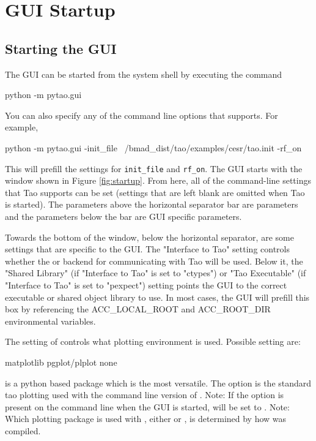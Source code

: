 \chapter{GUI Startup}
\label{s:gui.startup}

\section{Starting the GUI}

The GUI can be started from the system shell by executing the command
\begin{example}
  python -m pytao.gui
\end{example}
You can also specify any of the command line options that \tao supports.  For example,
\begin{example}
  python -m pytao.gui -init_file ~/bmad_dist/tao/examples/cesr/tao.init -rf_on
\end{example}
This will prefill the settings for \texttt{init_file} and \texttt{rf_on}. The GUI starts with the
window shown in Figure \ref{fig:startup}. From here, all of the command-line settings that Tao
supports can be set (settings that are left blank are omitted when Tao is started). The parameters
above the horizontal separator bar are \tao parameters and the parameters below the bar are GUI
specific parameters.

Towards the bottom of the window, below the horizontal separator, are some settings that are
specific to the GUI.  The "Interface to Tao" setting controls whether the  or
 backend for communicating with Tao will be used.  Below it, the "Shared Library" (if
"Interface to Tao" is set to "ctypes") or "Tao Executable" (if "Interface to Tao" is set to
"pexpect") setting points the GUI to the correct executable or shared object library to use.  In
most cases, the GUI will prefill this box by referencing the ACC_LOCAL_ROOT and ACC_ROOT_DIR
environmental variables.

The setting of  controls what plotting environment is used. Possible setting are:
\begin{example}
  matplotlib
  pgplot/plplot
  none
\end{example}
 is a python based package which is the most versatile. The  option
is the standard tao plotting used with the command line version of \tao. Note: If the \tao {} option
is present on the command line when the GUI is started,  will be set to .
Note: Which plotting package is
used with , either  or , is determined by how \tao was compiled.

